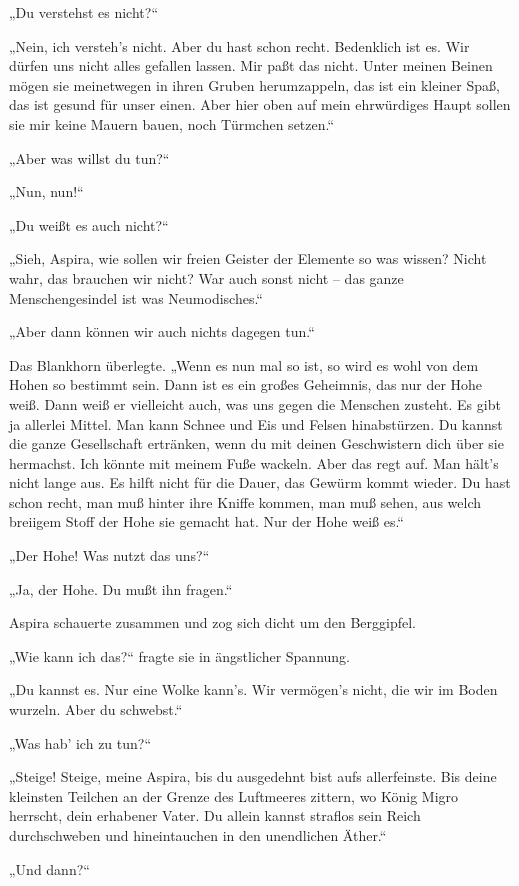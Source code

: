 „Du verstehst es nicht?“

„Nein, ich versteh's nicht. Aber du hast schon recht. Bedenklich
ist es. Wir dürfen uns nicht alles gefallen lassen. Mir paßt das
nicht. Unter meinen Beinen mögen sie meinetwegen in ihren Gruben
herumzappeln, das ist ein kleiner Spaß, das ist gesund für unser
einen. Aber hier oben auf mein ehrwürdiges Haupt sollen sie mir
keine Mauern bauen, noch Türmchen setzen.“

„Aber was willst du tun?“

„Nun, nun!“

„Du weißt es auch nicht?“

„Sieh, Aspira, wie sollen wir freien Geister der Elemente so was
wissen? Nicht wahr, das brauchen wir nicht? War auch sonst nicht –
das ganze Menschengesindel ist was Neumodisches.“

„Aber dann können wir auch nichts dagegen tun.“

Das Blankhorn überlegte. „Wenn es nun mal so ist, so wird es wohl
von dem Hohen so bestimmt sein. Dann ist es ein großes Geheimnis,
das nur der Hohe weiß. Dann weiß er vielleicht auch, was uns gegen
die Menschen zusteht. Es gibt ja allerlei Mittel. Man kann Schnee
und Eis und Felsen hinabstürzen. Du kannst die ganze Gesellschaft
ertränken, wenn du mit deinen Geschwistern dich über sie hermachst.
Ich könnte mit meinem Fuße wackeln. Aber das regt auf. Man hält's
nicht lange aus. Es hilft nicht für die Dauer, das Gewürm kommt
wieder. Du hast schon recht, man muß hinter ihre Kniffe kommen, man
muß sehen, aus welch breiigem Stoff der Hohe sie gemacht hat. Nur
der Hohe weiß es.“

„Der Hohe! Was nutzt das uns?“

„Ja, der Hohe. Du mußt ihn fragen.“

Aspira schauerte zusammen und zog sich dicht um den Berggipfel.

„Wie kann ich das?“ fragte sie in ängstlicher Spannung.

„Du kannst es. Nur eine Wolke kann's. Wir vermögen's nicht, die wir
im Boden wurzeln. Aber du schwebst.“

„Was hab' ich zu tun?“

„Steige! Steige, meine Aspira, bis du ausgedehnt bist aufs
allerfeinste. Bis deine kleinsten Teilchen an der Grenze des
Luftmeeres zittern, wo König Migro herrscht, dein erhabener Vater.
Du allein kannst straflos sein Reich durchschweben und
hineintauchen in den unendlichen Äther.“

„Und dann?“


